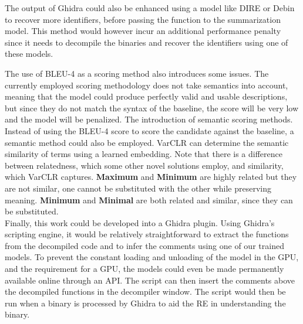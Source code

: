 The output of Ghidra could also be enhanced using a model like DIRE \cite{Dire} or Debin \cite{Debin} to recover more identifiers, before passing the function to the summarization model. This method would however incur an additional performance penalty since it needs to decompile the binaries and recover the identifiers using one of these models.

The use of BLEU-4 as a scoring method also introduces some issues. The currently employed scoring methodology does not take semantics into account, meaning that the model could produce perfectly valid and usable descriptions, but since they do not match the syntax of the baseline, the score will be very low and the model will be penalized. The introduction of semantic scoring methods. Instead of using the BLEU-4 score to score the candidate against the baseline, a semantic method could also be employed. VarCLR \cite{VarCLR} can determine the semantic similarity of terms using a learned embedding. Note that there is a difference between relatedness, which some other novel solutions employ, and similarity, which VarCLR captures. \textbf{Maximum} and \textbf{Minimum} are highly related but they are not similar, one cannot be substituted with the other while preserving meaning. \textbf{Minimum} and \textbf{Minimal} are both related and similar, since they can be substituted. \\

Finally, this work could be developed into a Ghidra plugin. Using Ghidra's scripting engine, it would be relatively straightforward to extract the functions from the decompiled code and to infer the comments using one of our trained models. To prevent the constant loading and unloading of the model in the GPU, and the requirement for a GPU, the models could even be made permanently available online through an API. The script can then insert the comments above the decompiled functions in the decompiler window. The script would then be run when a binary is processed by Ghidra to aid the RE in understanding the binary.

